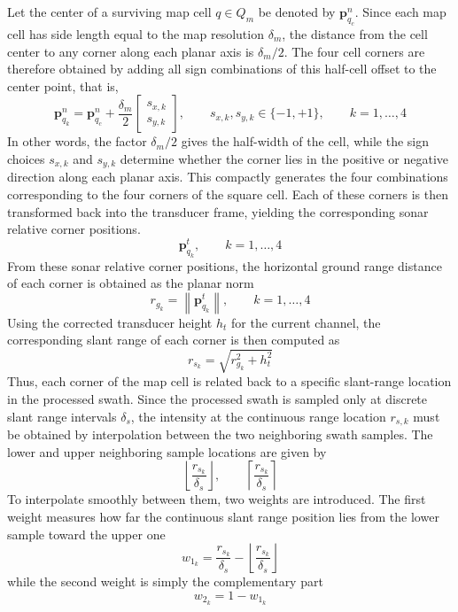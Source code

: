 \\ \\
Let the center of a surviving map cell $q \in Q_m$ be denoted by $\mathbf{p}_{q_c}^{n}$. Since each map cell has side length equal to the map resolution $\delta_m$, the distance from the cell center to any corner along each planar axis is $\delta_m/2$. The four cell corners are therefore obtained by adding all sign combinations of this half-cell offset to the center point, that is,
$$
    \mathbf{p}_{q_k}^{n}
    =
    \mathbf{p}_{q_c}^{n}
    +
    \frac{\delta_m}{2}
    \begin{bmatrix}
        s_{x,k} \\ s_{y,k}
    \end{bmatrix},
    \qquad
    s_{x,k}, s_{y,k} \in \{-1,+1\},
    \qquad
    k=1,\dots,4
$$
In other words, the factor $\delta_m/2$ gives the half-width of the cell, while the sign choices $s_{x,k}$ and $s_{y,k}$ determine whether the corner lies in the positive or negative direction along each planar axis. This compactly generates the four combinations corresponding to the four corners of the square cell. Each of these corners is then transformed back into the transducer frame, yielding the corresponding sonar relative corner positions.
$$
    \mathbf{p}_{q_k}^{t}, \qquad k=1,\dots,4
$$
From these sonar relative corner positions, the horizontal ground range distance of each corner is obtained as the planar norm
$$
    r_{g_k} = \left\| \mathbf{p}_{q_k}^{t} \right\|,
    \qquad k=1,\dots,4
$$
Using the corrected transducer height $h_t$ for the current channel, the corresponding slant range of each corner is then computed as
$$
    r_{s_k} = \sqrt{r_{g_k}^2 + h_t^2}
$$
Thus, each corner of the map cell is related back to a specific slant-range location in the processed swath. Since the processed swath is sampled only at discrete slant range intervals $\delta_s$, the intensity at the continuous range location $r_{s,k}$ must be obtained by interpolation between the two neighboring swath samples. The lower and upper neighboring sample locations are given by
$$
    \left\lfloor \frac{r_{s_k}}{\delta_s} \right\rfloor,
    \qquad
    \left\lceil \frac{r_{s_k}}{\delta_s} \right\rceil
$$
To interpolate smoothly between them, two weights are introduced. The first weight measures how far the continuous slant range position lies from the lower sample toward the upper one
$$
    w_{1_k}
    =
    \frac{r_{s_k}}{\delta_s}
    -
    \left\lfloor \frac{r_{s_k}}{\delta_s} \right\rfloor
$$
while the second weight is simply the complementary part
$$
    w_{2_k} = 1 - w_{1_k}
$$
